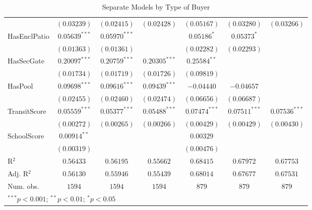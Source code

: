 \begin{table}
\begin{center}
\begin{footnotesize}
\begin{tabular}{l c c c c c c}
             & $(0.03239)$       & $(0.02415)$       & $(0.02428)$       & $(0.05167)$      & $(0.03280)$      & $(0.03266)$      \\
HasEnclPatio & $0.05639^{***}$   & $0.05970^{***}$   &                   & $0.05186^{*}$    & $0.05373^{*}$    &                  \\
             & $(0.01363)$       & $(0.01361)$       &                   & $(0.02282)$      & $(0.02293)$      &                  \\
HasSecGate   & $0.20097^{***}$   & $0.20759^{***}$   & $0.20305^{***}$   & $0.25584^{**}$   &                  &                  \\
             & $(0.01734)$       & $(0.01719)$       & $(0.01726)$       & $(0.09819)$      &                  &                  \\
HasPool      & $0.09698^{***}$   & $0.09616^{***}$   & $0.09439^{***}$   & $-0.04440$       & $-0.04657$       &                  \\
             & $(0.02455)$       & $(0.02460)$       & $(0.02474)$       & $(0.06656)$      & $(0.06687)$      &                  \\
TransitScore & $0.05559^{***}$   & $0.05377^{***}$   & $0.05488^{***}$   & $0.07474^{***}$  & $0.07511^{***}$  & $0.07536^{***}$  \\
             & $(0.00272)$       & $(0.00265)$       & $(0.00266)$       & $(0.00429)$      & $(0.00429)$      & $(0.00430)$      \\
SchoolScore  & $0.00914^{**}$    &                   &                   & $0.00329$        &                  &                  \\
             & $(0.00319)$       &                   &                   & $(0.00476)$      &                  &                  \\
\hline
R$^2$        & $0.56433$         & $0.56195$         & $0.55662$         & $0.68415$        & $0.67972$        & $0.67753$        \\
Adj. R$^2$   & $0.56130$         & $0.55946$         & $0.55439$         & $0.68014$        & $0.67677$        & $0.67531$        \\
Num. obs.    & $1594$            & $1594$            & $1594$            & $879$            & $879$            & $879$            \\
\hline
\multicolumn{7}{l}{\tiny{$^{***}p<0.001$; $^{**}p<0.01$; $^{*}p<0.05$}}
\end{tabular}
\end{footnotesize}
\caption{Separate Models by Type of Buyer}
\label{tab:reg_buyer}
\end{center}
\end{table}
